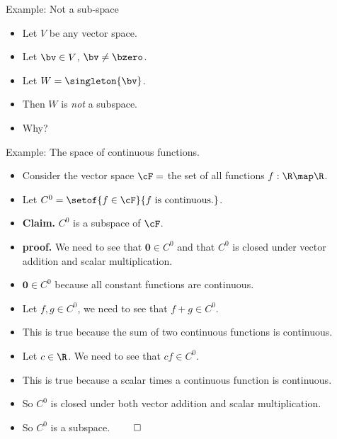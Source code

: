 \documentclass{beamer}
\begin{document}
\begin{frame}{Example: Not a sub-space}

\begin{itemize}
\item Let $V$ be any vector space.
\item Let $\bv\in V$, $\bv\not=\bzero$.
\item Let $W=\singleton{\bv}$.
\item Then $W$ is \emph{not} a subspace.
\item Why?
\end{itemize}
\end{frame}

\begin{frame}{Example: The space of continuous functions.}

\begin{itemize}
\item Consider the vector space $\cF =$ the set of all functions $f:\R\map\R$.
\item Let $C^0 = \setof{f\in\cF}{f \text{ is continuous.}}$.
\item \textbf{Claim.} $C^0$ is a subspace of $\cF$.
\item \textbf{proof.} We need to see that $\textbf{0}\in C^0$ and that
$C^0$ is closed under vector
addition and scalar multiplication.
\item $\textbf{0} \in C^0$ because all constant functions are continuous.
\item Let $f,g\in C^0$, we need to see that $f+g\in C^0$.
\item This is true because the sum of two continuous functions is continuous.
\item Let $c\in \R$. We need to see that $c f \in C^0$.
\item This is true because a scalar times a continuous function is continuous.
\item So $C^0$ is closed under both vector addition and scalar multiplication.
\item So $C^0$ is a subspace. $\qed$
\end{itemize}
\end{frame}
\end{document}
